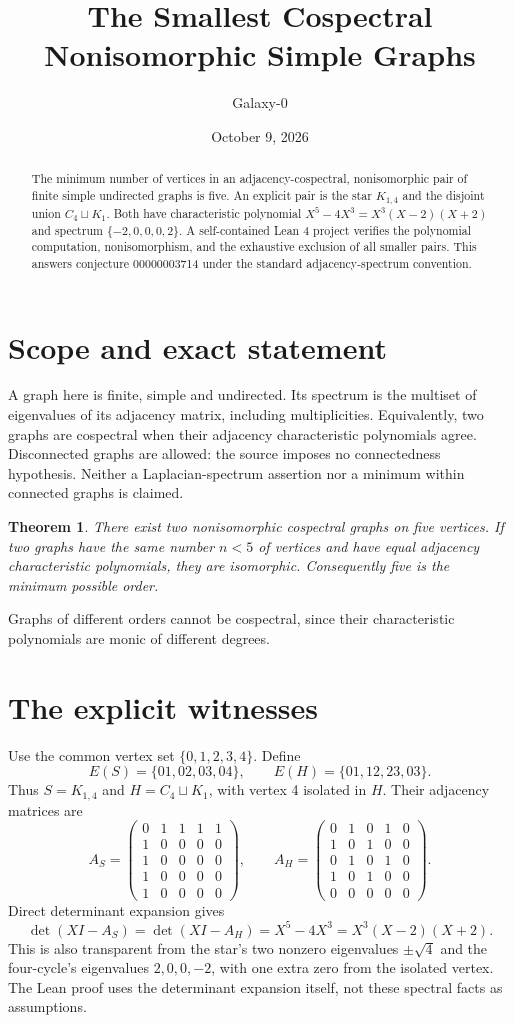 \documentclass[10pt]{article}
\title{The Smallest Cospectral Nonisomorphic Simple Graphs}
\author{Galaxy-0}
\date{October 9, 2026}
\newtheorem{theorem}{Theorem}
\begin{document}
\maketitle
\begin{abstract}
The minimum number of vertices in an adjacency-cospectral, nonisomorphic pair of finite simple undirected graphs is five. An explicit pair is the star $K_{1,4}$ and the disjoint union $C_4\sqcup K_1$. Both have characteristic polynomial $X^5-4X^3=X^3(X-2)(X+2)$ and spectrum $\{-2,0,0,0,2\}$. A self-contained Lean 4 project verifies the polynomial computation, nonisomorphism, and the exhaustive exclusion of all smaller pairs. This answers conjecture 00000003714 under the standard adjacency-spectrum convention.
\end{abstract}
\section{Scope and exact statement}
A graph here is finite, simple and undirected. Its spectrum is the multiset of eigenvalues of its adjacency matrix, including multiplicities. Equivalently, two graphs are cospectral when their adjacency characteristic polynomials agree. Disconnected graphs are allowed: the source imposes no connectedness hypothesis. Neither a Laplacian-spectrum assertion nor a minimum within connected graphs is claimed.
\begin{theorem}
There exist two nonisomorphic cospectral graphs on five vertices. If two graphs have the same number $n<5$ of vertices and have equal adjacency characteristic polynomials, they are isomorphic. Consequently five is the minimum possible order.
\end{theorem}
Graphs of different orders cannot be cospectral, since their characteristic polynomials are monic of different degrees.
\section{The explicit witnesses}
Use the common vertex set $\{0,1,2,3,4\}$. Define
\[
 E(S)=\{01,02,03,04\},\qquad E(H)=\{01,12,23,03\}.
\]
Thus $S=K_{1,4}$ and $H=C_4\sqcup K_1$, with vertex 4 isolated in $H$. Their adjacency matrices are
\[
 A_S=\begin{pmatrix}0&1&1&1&1\\1&0&0&0&0\\1&0&0&0&0\\1&0&0&0&0\\1&0&0&0&0\end{pmatrix},
 \qquad
 A_H=\begin{pmatrix}0&1&0&1&0\\1&0&1&0&0\\0&1&0&1&0\\1&0&1&0&0\\0&0&0&0&0\end{pmatrix}.
\]
Direct determinant expansion gives
\[
 \det(XI-A_S)=\det(XI-A_H)=X^5-4X^3=X^3(X-2)(X+2).
\]
This is also transparent from the star's two nonzero eigenvalues $\pm\sqrt4$ and the four-cycle's eigenvalues $2,0,0,-2$, with one extra zero from the isolated vertex. The Lean proof uses the determinant expansion itself, not these spectral facts as assumptions.
\end{document}
